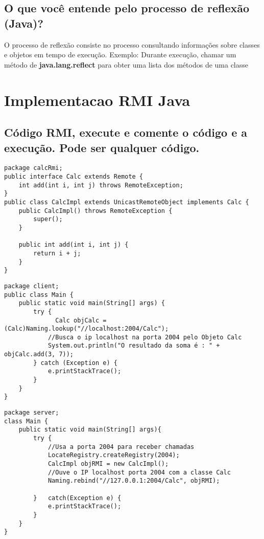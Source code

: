 \documentclass[12pt]{article}
\begin{document}
\subsection{O que você entende pelo processo de reflexão (Java)?} 
O processo de reflexão consiste no processo consultando informações sobre classes e objetos em tempo de execução. Exemplo: Durante execução, chamar um método de \textbf{java.lang.reflect} para obter uma lista dos métodos de uma classe

\section{Implementacao RMI Java}\label{sec:impl_rmi}

\subsection{Código RMI, execute e comente o código e a execução. Pode ser qualquer código.}

\begin{lstlisting}[caption={Classe CalcImpl e Calc}, label=lst:calc_rmi]
package calcRmi;
public interface Calc extends Remote {
    int add(int i, int j) throws RemoteException;
}
public class CalcImpl extends UnicastRemoteObject implements Calc {
    public CalcImpl() throws RemoteException {
        super();
    }

    public int add(int i, int j) {
        return i + j;
    }
}
\end{lstlisting}

\begin{lstlisting}[caption={Cliente}, label=lst:calc_rmi_client]
package client;
public class Main {
	public static void main(String[] args) {
		try {
		      Calc objCalc = (Calc)Naming.lookup("//localhost:2004/Calc"); 
			//Busca o ip localhost na porta 2004 pelo Objeto Calc
            System.out.println("O resultado da soma é : " + objCalc.add(3, 7));
		} catch (Exception e) {
			e.printStackTrace();
		}
	}
}
\end{lstlisting}

\begin{lstlisting}[caption={Servidor}, label=lst:calc_rmi_server]
package server;
class Main {
	public static void main(String[] args){
		try {
			//Usa a porta 2004 para receber chamadas
			LocateRegistry.createRegistry(2004); 
			CalcImpl objRMI = new CalcImpl();
			//Ouve o IP localhost porta 2004 com a classe Calc
			Naming.rebind("//127.0.0.1:2004/Calc", objRMI);

		}	catch(Exception e) {
			e.printStackTrace();
		}
	}
}
\end{lstlisting}
\end{document}
